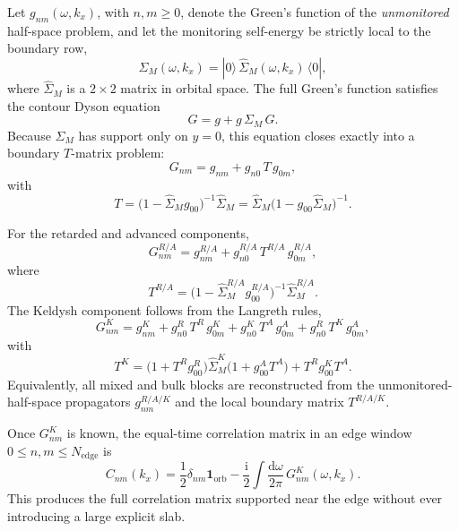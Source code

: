 \documentclass[11pt]{article}
\newcommand{\ii}{\mathrm{i}}
\newcommand{\rd}{\mathrm{d}}
\newcommand{\Id}{\mathbf{1}}
\begin{document}
Let \(g_{nm}(\omega,k_x)\), with \(n,m\ge 0\), denote the Green's function of
the \emph{unmonitored} half-space problem, and let the monitoring self-energy be
strictly local to the boundary row,
\begin{equation}
  \Sigma_M(\omega,k_x)
  =
  |0\rangle\,\hat\Sigma_M(\omega,k_x)\,\langle 0|,
\end{equation}
where \(\hat\Sigma_M\) is a \(2\times 2\) matrix in orbital space.  The full
Green's function satisfies the contour Dyson equation
\begin{equation}
  G = g + g\,\Sigma_M\,G.
\end{equation}
Because \(\Sigma_M\) has support only on \(y=0\), this equation closes exactly
into a boundary \(T\)-matrix problem:
\begin{equation}
  G_{nm} = g_{nm} + g_{n0}\,T\,g_{0m},
\end{equation}
with
\begin{equation}
  T
  =
  \bigl(1-\hat\Sigma_M g_{00}\bigr)^{-1}\hat\Sigma_M
  =
  \hat\Sigma_M\bigl(1-g_{00}\hat\Sigma_M\bigr)^{-1}.
\end{equation}

For the retarded and advanced components,
\begin{equation}
  G_{nm}^{R/A}
  =
  g_{nm}^{R/A}
  +
  g_{n0}^{R/A}\,T^{R/A}\,g_{0m}^{R/A},
\end{equation}
where
\begin{equation}
  T^{R/A}
  =
  \bigl(1-\hat\Sigma_M^{R/A} g_{00}^{R/A}\bigr)^{-1}\hat\Sigma_M^{R/A}.
\end{equation}
The Keldysh component follows from the Langreth rules,
\begin{equation}
  G_{nm}^{K}
  =
  g_{nm}^{K}
  +
  g_{n0}^{R}\,T^{R}\,g_{0m}^{K}
  +
  g_{n0}^{K}\,T^{A}\,g_{0m}^{A}
  +
  g_{n0}^{R}\,T^{K}\,g_{0m}^{A},
\end{equation}
with
\begin{equation}
  T^{K}
  =
  \bigl(1+T^{R}g_{00}^{R}\bigr)\hat\Sigma_M^{K}\bigl(1+g_{00}^{A}T^{A}\bigr)
  +
  T^{R}g_{00}^{K}T^{A}.
\end{equation}
Equivalently, all mixed and bulk blocks are reconstructed from the
unmonitored-half-space propagators \(g_{nm}^{R/A/K}\) and the local boundary
matrix \(T^{R/A/K}\).

Once \(G_{nm}^{K}\) is known, the equal-time correlation matrix in an edge
window \(0\le n,m\le N_{\mathrm{edge}}\) is
\begin{equation}
  C_{nm}(k_x)
  =
  \frac{1}{2}\delta_{nm}\Id_{\mathrm{orb}}
  -
  \frac{\ii}{2}\int\frac{\rd\omega}{2\pi}\,G_{nm}^{K}(\omega,k_x).
\end{equation}
This produces the full correlation matrix supported near the edge without ever
introducing a large explicit slab.
\end{document}
